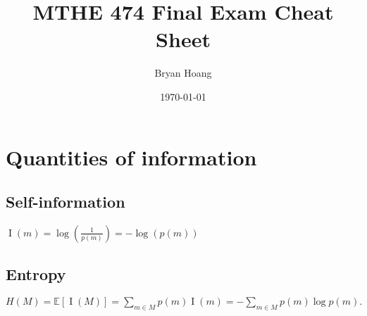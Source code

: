 \documentclass[
  draft,
]{mathcheatsheet}
\title{MTHE 474 Final Exam Cheat Sheet}
\author{Bryan Hoang}
\date{\today}
\begin{document}
  \maketitle{}
  \section{Quantities of information}
  \subsection{Self-information}
  \(
  \operatorname{I}(m) = \log\left(\frac{1}{p(m)}\right) = -\log(p(m))
  \)\\
  \subsection{Entropy}
  \(
  H(M) = \mathbb{E} \left[\operatorname{I}(M)\right] = \sum_{m \in M} p(m) \operatorname{I}(m) = -\sum_{m \in M} p(m) \log p(m).
  \)\\

  \blinddocument{}
\end{document}
